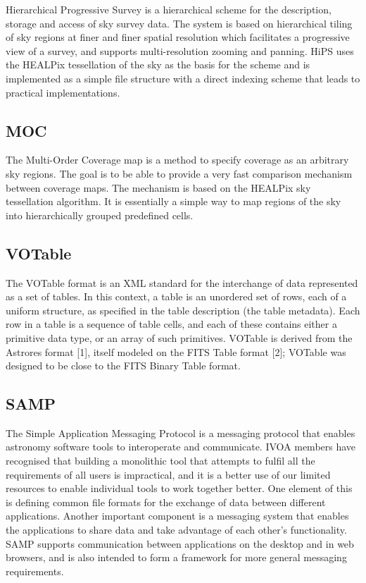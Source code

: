 \documentclass[11pt,a4paper]{ivoa}
\begin{document}
Hierarchical Progressive Survey is a hierarchical scheme for the description, storage and 
access of sky survey data. The system is based on hierarchical tiling of sky regions at 
finer and finer spatial resolution which facilitates a progressive view of a survey, and 
supports multi-resolution zooming and panning. HiPS uses the HEALPix tessellation of the 
sky as the basis for the scheme and is implemented as a simple file structure with a direct 
indexing scheme that leads to practical implementations. 

\subsection{MOC}

The Multi-Order Coverage map is a method to specify coverage as an arbitrary sky regions. 
The goal is to be able to provide a very fast comparison mechanism between coverage maps. 
The mechanism is based on the HEALPix sky tessellation algorithm. It is essentially a 
simple way to map regions of the sky into hierarchically grouped predefined cells. 

\subsection{VOTable} 

The VOTable format is an XML standard for the interchange of data represented as a set of tables. 
In this context, a table is an unordered set of rows, each of a uniform structure, as specified 
in the table description (the table metadata). Each row in a table is a sequence of table cells, 
and each of these contains either a primitive data type, or an array of such primitives. VOTable 
is derived from the Astrores format [1], itself modeled on the FITS Table format [2]; VOTable 
was designed to be close to the FITS Binary Table format. 

\subsection{SAMP}

The Simple Application Messaging Protocol is a messaging protocol that enables astronomy software 
tools to interoperate and communicate. IVOA members have recognised that building a monolithic tool 
that attempts to fulfil all the requirements of all users is impractical, and it is a better use 
of our limited resources to enable individual tools to work together better. One element of this 
is defining common file formats for the exchange of data between different applications. Another 
important component is a messaging system that enables the applications to share data and take 
advantage of each other's functionality. SAMP supports communication between applications on the 
desktop and in web browsers, and is also intended to form a framework for more general messaging 
requirements. 
\end{document}
